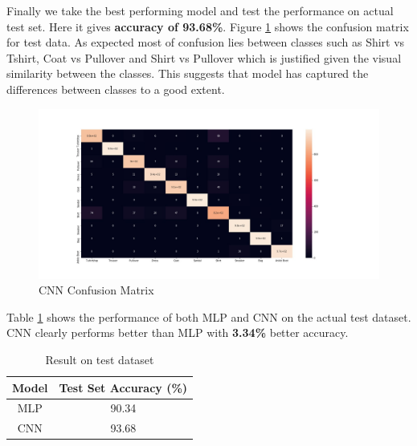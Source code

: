 \documentclass[10pt,a4paper]{article}
\begin{document}
Finally we take the best performing model and test the performance on actual test set. Here it gives \textbf{accuracy of 93.68\%}. Figure \ref{cnncm} shows the confusion matrix for test data. As expected most of confusion lies between classes such as Shirt vs Tshirt, Coat vs Pullover and Shirt vs Pullover which is justified given the visual similarity between the classes. This suggests that model has captured the differences between classes to a good extent.

\begin{figure}[h!]
	\includegraphics[width=1.3\linewidth]{cm_cnn.jpg}
	\caption{CNN Confusion Matrix}
	\label{cnncm}
\end{figure}

Table \ref{table:3} shows the performance of both MLP and CNN on the actual test dataset. CNN clearly performs better than MLP with \textbf{3.34\%} better accuracy.

\begin{table}[h!]
\centering
\begin{tabular}{|c| c|} 
 \hline
 Model & Test Set Accuracy (\%) \\
 \hline\hline
MLP & 90.34 \\ 
 \hline
CNN & 93.68 \\ 
 \hline

\end{tabular}
\caption{Result on test dataset }
\label{table:3}
\end{table}




\end{document}
